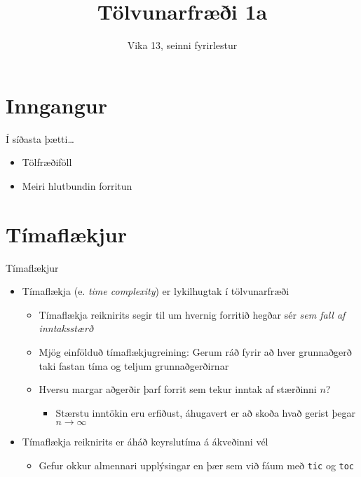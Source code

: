 \documentclass[handout]{beamer}
\title{Tölvunarfræði 1a}
\subtitle{Vika 13, seinni fyrirlestur}
\begin{document}
\begin{frame}
\titlepage
\end{frame}

\section{Inngangur}

\begin{frame}{Í síðasta þætti\ldots}
    \begin{itemize}
        \item Tölfræðiföll
        \item Meiri hlutbundin forritun
    \end{itemize}
\end{frame}

\section{Tímaflækjur}

\begin{frame}{Tímaflækjur}
    \begin{itemize}
        \item Tímaflækja (e. \emph{time complexity}) er lykilhugtak í tölvunarfræði
        \begin{itemize}
            \item Tímaflækja reiknirits segir til um hvernig forritið hegðar sér \emph{sem fall af inntaksstærð}
            \item Mjög einfölduð tímaflækjugreining: Gerum ráð fyrir að hver grunnaðgerð taki fastan tíma og teljum grunnaðgerðirnar
            \item Hversu margar aðgerðir þarf forrit sem tekur inntak af stærðinni $n$?
            \begin{itemize}
                \item Stærstu inntökin eru erfiðust, áhugavert er að skoða hvað gerist þegar $n \to \infty$
            \end{itemize}
        \end{itemize}
        \item Tímaflækja reiknirits er áháð keyrslutíma á ákveðinni vél 
        \begin{itemize}
            \item Gefur okkur almennari upplýsingar en þær sem við fáum með \texttt{tic} og \texttt{toc}
        \end{itemize}
    \end{itemize}
\end{frame}
\end{document}

